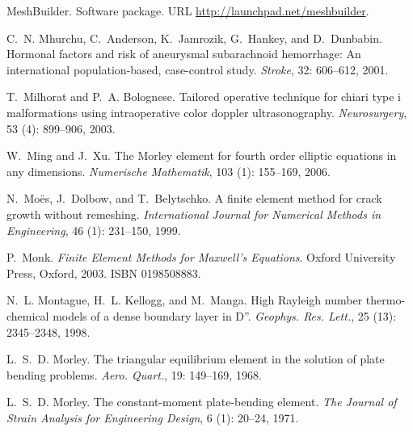 \begin{thebibliography}{467}
MeshBuilder.
\newblock Software package.
\newblock URL \url{http://launchpad.net/meshbuilder}.

C.~N. Mhurchu, C.~Anderson, K.~Jamrozik, G.~Hankey, and D.~Dunbabin.
\newblock Hormonal factors and risk of aneurysmal subarachnoid hemorrhage: An
  international population-based, case-control study.
\newblock \emph{Stroke}, 32: 606--612, 2001.

T.~Milhorat and P.~A. Bolognese.
\newblock Tailored operative technique for chiari type i malformations using
  intraoperative color doppler ultrasonography.
\newblock \emph{Neurosurgery}, 53 (4): 899--906, 2003.

W.~Ming and J.~Xu.
\newblock The {M}orley element for fourth order elliptic equations in any
  dimensions.
\newblock \emph{Numerische Mathematik}, 103 (1): 155--169,
  2006.

N.~Mo\"es, J.~Dolbow, and T.~Belytschko.
\newblock A finite element method for crack growth without remeshing.
\newblock \emph{International Journal for Numerical Methods in Engineering},
  46 (1): 231--150, 1999.

P.~Monk.
\newblock \emph{Finite Element Methods for {M}axwell's Equations}.
\newblock Oxford University Press, Oxford, 2003.
\newblock ISBN 0198508883.

N.~L. Montague, H.~L. Kellogg, and M.~Manga.
\newblock High {R}ayleigh number thermo-chemical models of a dense boundary
  layer in {D''}.
\newblock \emph{Geophys. Res. Lett.}, 25 (13): 2345--2348,
  1998.

L.~S.~D. Morley.
\newblock The triangular equilibrium element in the solution of plate bending
  problems.
\newblock \emph{Aero. Quart.}, 19: 149--169, 1968.

L.~S.~D. Morley.
\newblock The constant-moment plate-bending element.
\newblock \emph{The Journal of Strain Analysis for Engineering Design},
  6 (1): 20--24, 1971.


\end{thebibliography}

